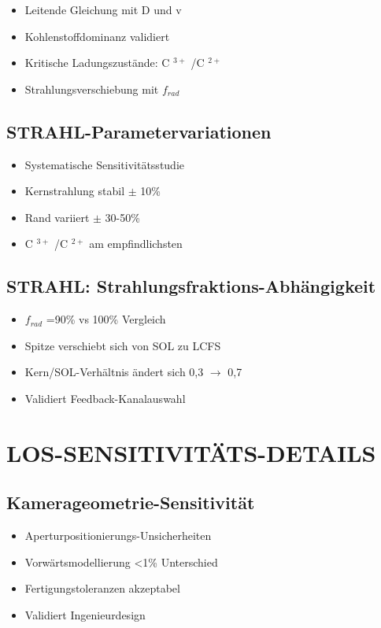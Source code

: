 \documentclass[11pt,a4paper]{article}
\begin{document}
\begin{itemize}
\item Leitende Gleichung mit D und v
\item Kohlenstoffdominanz validiert
\item Kritische Ladungszustände: C $ ^{3+} $ /C $ ^{2+} $
\item Strahlungsverschiebung mit $ f_{rad} $
\end{itemize}

\subsection{STRAHL-Parametervariationen}

\begin{itemize}
\item Systematische Sensitivitätsstudie
\item Kernstrahlung stabil $\pm $ 10\%
\item Rand variiert $\pm $ 30-50\%
\item C $ ^{3+} $ /C $ ^{2+} $ am empfindlichsten
\end{itemize}

\subsection{STRAHL: Strahlungsfraktions-Abhängigkeit}

\begin{itemize}
\item $ f_{rad} $ =90\% vs 100\% Vergleich
\item Spitze verschiebt sich von SOL zu LCFS
\item Kern/SOL-Verhältnis ändert sich 0,3 $\rightarrow $ 0,7
\item Validiert Feedback-Kanalauswahl
\end{itemize}

\section{LOS-SENSITIVITÄTS-DETAILS}

\subsection{Kamerageometrie-Sensitivität}

\begin{itemize}
\item Aperturpositionierungs-Unsicherheiten
\item Vorwärtsmodellierung <1\% Unterschied
\item Fertigungstoleranzen akzeptabel
\item Validiert Ingenieurdesign
\end{itemize}
\end{document}
